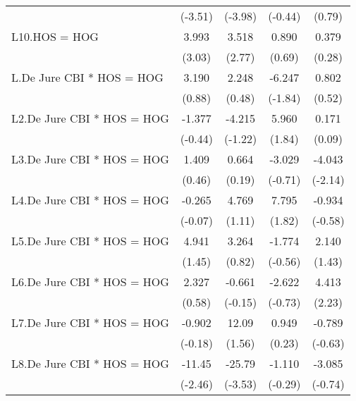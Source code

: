 {\begin{tabular}{l*{4}{c}}
                &  (-3.51)         &  (-3.98)         &  (-0.44)         &   (0.79)         \\
[1em]
L10.HOS = HOG   &    3.993\sym{**} &    3.518\sym{**} &    0.890         &    0.379         \\
                &   (3.03)         &   (2.77)         &   (0.69)         &   (0.28)         \\
[1em]
L.De Jure CBI * HOS = HOG&    3.190         &    2.248         &   -6.247         &    0.802         \\
                &   (0.88)         &   (0.48)         &  (-1.84)         &   (0.52)         \\
[1em]
L2.De Jure CBI * HOS = HOG&   -1.377         &   -4.215         &    5.960         &    0.171         \\
                &  (-0.44)         &  (-1.22)         &   (1.84)         &   (0.09)         \\
[1em]
L3.De Jure CBI * HOS = HOG&    1.409         &    0.664         &   -3.029         &   -4.043\sym{*}  \\
                &   (0.46)         &   (0.19)         &  (-0.71)         &  (-2.14)         \\
[1em]
L4.De Jure CBI * HOS = HOG&   -0.265         &    4.769         &    7.795         &   -0.934         \\
                &  (-0.07)         &   (1.11)         &   (1.82)         &  (-0.58)         \\
[1em]
L5.De Jure CBI * HOS = HOG&    4.941         &    3.264         &   -1.774         &    2.140         \\
                &   (1.45)         &   (0.82)         &  (-0.56)         &   (1.43)         \\
[1em]
L6.De Jure CBI * HOS = HOG&    2.327         &   -0.661         &   -2.622         &    4.413\sym{*}  \\
                &   (0.58)         &  (-0.15)         &  (-0.73)         &   (2.23)         \\
[1em]
L7.De Jure CBI * HOS = HOG&   -0.902         &    12.09         &    0.949         &   -0.789         \\
                &  (-0.18)         &   (1.56)         &   (0.23)         &  (-0.63)         \\
[1em]
L8.De Jure CBI * HOS = HOG&   -11.45\sym{*}  &   -25.79\sym{***}&   -1.110         &   -3.085         \\
                &  (-2.46)         &  (-3.53)         &  (-0.29)         &  (-0.74)         \\

\end{tabular}}
